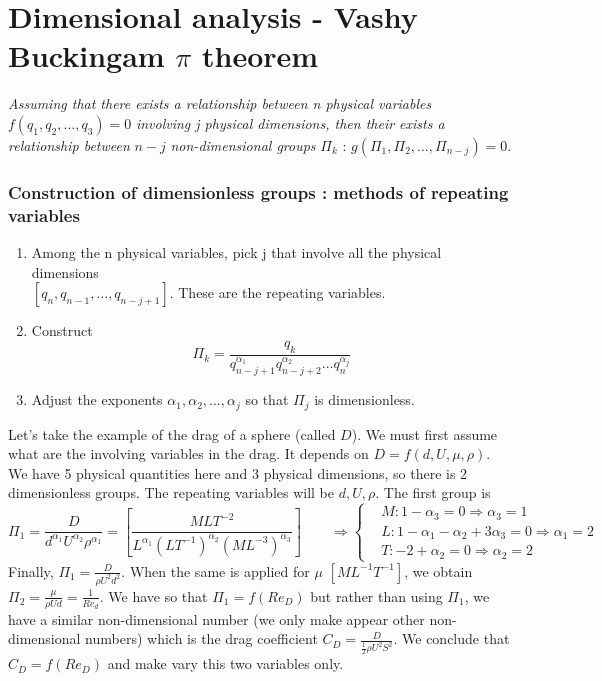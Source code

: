 \section{Dimensional analysis - Vashy Buckingam $\pi$ theorem}
	\textit{Assuming that there exists a relationship between n physical variables} $f(q_1,q_2,\dots ,q_3) =0$ \textit{involving j physical dimensions, then their exists a relationship between} $n-j$ \textit{non-dimensional groups} $\Pi _k$ : $g(\Pi _1,\Pi _2,\dots ,\Pi _{n-j}) = 0$. 
	
	\subsubsection{Construction of dimensionless groups : methods of repeating variables}
		\begin{enumerate}
			\item Among the n physical variables, pick j that involve all the physical dimensions \\$[q_n,q_{n-1},\dots ,q_{n-j+1}]$. These are the repeating variables. 

			\item Construct 
			\begin{equation}
				\Pi _k = \frac{q_k}{q_{n-j+1}^{\alpha _1}q_{n-j+2}^{\alpha _2}\dots q_{n}^{\alpha _j}}
			\end{equation}
			
			\item Adjust the exponents $\alpha _1, \alpha _2, \dots , \alpha _j$ so that $\Pi _j$ is dimensionless. 
		\end{enumerate}
		
		Let's take the example of the drag of a sphere (called $D$). We must first assume what are the involving variables in the drag. It depends on $D = f(d,U,\mu , \rho)$. We have 5 physical quantities here and 3 physical dimensions, so there is 2 dimensionless groups. The repeating variables will be $d,U, \rho$. The first group is 
		\begin{equation}
			\Pi _1 = \frac{D}{d^{\alpha _1} U^{\alpha _2}\rho ^{\alpha _1}} = \left[\frac{MLT^{-2}}{L^{\alpha _1}(LT^{-1})^{\alpha _2}(ML^{-3})^{\alpha _3}}\right] \qquad
			\Rightarrow 
			\left\{
			\begin{aligned}
			&M : 1-\alpha _3 = 0 \Rightarrow \alpha _3 = 1\\
			&L : 1- \alpha _1 - \alpha _2 +3 \alpha _3 = 0 \Rightarrow \alpha _1 = 2\\
			&T : -2 + \alpha _2 = 0 \Rightarrow \alpha _2 = 2 
			\end{aligned}
			\right.
		\end{equation}
		Finally, $\Pi _1 = \frac{D}{\rho U^2 d^2}$. When the same is applied for $\mu$ $[ML^{-1}T^{-1}]$, we obtain $\Pi _2 =\frac{\mu}{\rho U d} = \frac{1}{Re_d}$. We have so that $\Pi _1 = f(Re_D)$ but rather than using $\Pi _1$, we have a similar non-dimensional number (we only make appear other non-dimensional numbers) which is the drag coefficient $C_D = \frac{D}{\frac{1}{2}\rho U^2 S^2}$. We conclude that $C_D = f(Re_D)$ and make vary this two variables only.
		

